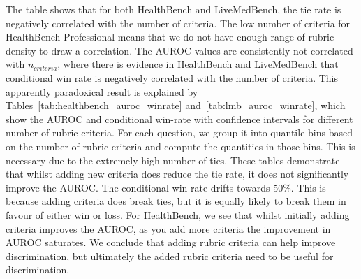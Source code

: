 \documentclass{article}
\begin{document}
The table shows that for both HealthBench and LiveMedBench, the tie rate is negatively correlated with the number of criteria. The low number of criteria for HealthBench Professional means that we do not have enough range of rubric density to draw a correlation. The AUROC values are consistently not correlated with $n_{criteria}$, where there is evidence in HealthBench and LiveMedBench that conditional win rate is negatively correlated with the number of criteria. This apparently paradoxical result is explained by Tables~\ref{tab:healthbench_auroc_winrate} and~\ref{tab:lmb_auroc_winrate}, which show the AUROC and conditional win-rate with confidence intervals for different number of rubric criteria. For each question, we group it into quantile bins based on the number of rubric criteria and compute the quantities in those bins. This is necessary due to the extremely high number of ties. These tables demonstrate that whilst adding new criteria does reduce the tie rate, it does not significantly improve the AUROC. The conditional win rate drifts towards 50\%. This is because adding criteria does break ties, but it is equally likely to break them in favour of either win or loss. For HealthBench, we see that whilst initially adding criteria improves the AUROC, as you add more criteria the improvement in AUROC saturates. We conclude that adding rubric criteria can help improve discrimination, but ultimately the added rubric criteria need to be useful for discrimination.
\end{document}
